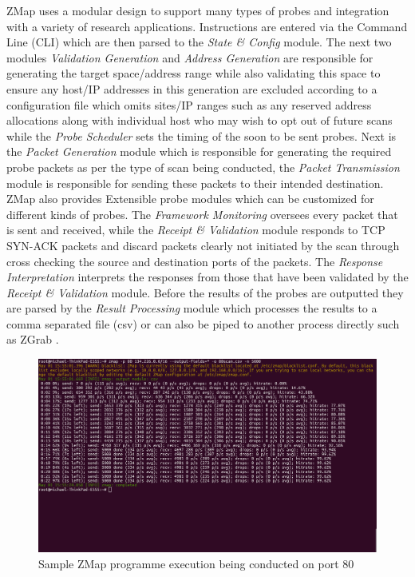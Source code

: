\documentclass[a4wide,leqno,12pt]{report}
\begin{document}
ZMap uses a modular design to support many types of probes and integration with a variety of research applications. Instructions are entered via the Command Line (CLI) which are then parsed to the \textit{State \& Config} module. The next two modules \textit{Validation Generation} and
\textit{Address Generation} are responsible for generating the target space/address range while also validating this space to ensure any host/IP addresses in this generation are excluded according to a configuration file which omits sites/IP ranges such as any reserved address allocations along with individual host who may wish to opt out of future scans \cite{durumeric2013zmap} while the \textit{Probe Scheduler} sets the timing of the soon to be sent probes. Next is the \textit{Packet Generation} module which is responsible for generating the required probe packets as per the type of scan being conducted, the \textit{Packet Transmission} module is responsible for sending these packets to their intended destination. ZMap also provides Extensible probe modules which can be customized for different kinds of probes. The \textit{Framework Monitoring} oversees every packet that is sent and received, while the \textit{Receipt \& Validation} module responds to TCP SYN-ACK packets and discard packets clearly not initiated by the scan through cross checking the source and destination ports of the packets. The \textit{Response Interpretation} interprets the responses from those that have been validated by the \textit{Receipt \& Validation} module. Before the results of the probes are outputted they are parsed by the \textit{Result Processing} module which processes the results to a comma separated file (csv) or can also be piped to another process directly such as ZGrab \cite{durumeric2013zmap}.\\

\begin{figure}[H]
\centering
\includegraphics[scale=.3]{pdf_images/zmap_scan_exmaple_2}
\caption{Sample ZMap programme execution being conducted on port 80}
\label{fig:zmap_scan_example}
\end{figure}
\end{document}
